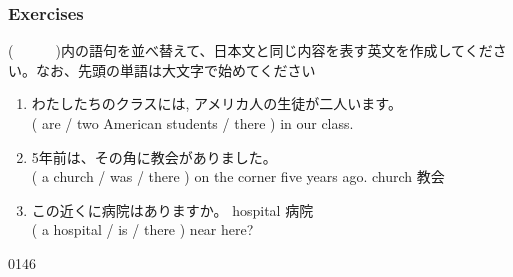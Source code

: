 \documentclass[aspectratio=169,xcolor={dvipsnames,table}]{beamer}
\newcommand{\myaudio}[1]{\href{#1}{\faVolumeUp}}
\begin{document}
\begin{frame}[plain]\frametitle{Exercises}

{\small (~~~~~~)内の語句を並べ替えて、日本文と同じ内容を表す英文を作成してください。なお、先頭の単語は大文字で始めてください}

  \begin{enumerate}
   \item {\small わたしたちのクラスには,
アメリカ人の生徒が二人います。}\\
         ( are / two American students / there ) in our class.\\
            \item {\small 5年前は、その角に教会がありました。}\\
         ( a church / was / there ) on the corner five years ago.%
\hfill{\scriptsize church  教会}\\
            \item {\small この近くに病院はありますか。}%
\hfill{\scriptsize hospital  病院}\\
         ( a hospital / is / there ) near here?\\
  \end{enumerate}
\hfill{\tiny 0146}\,{\scriptsize \myaudio{./audio/001_there_is_13.mp3}}
\end{frame}
\end{document}
